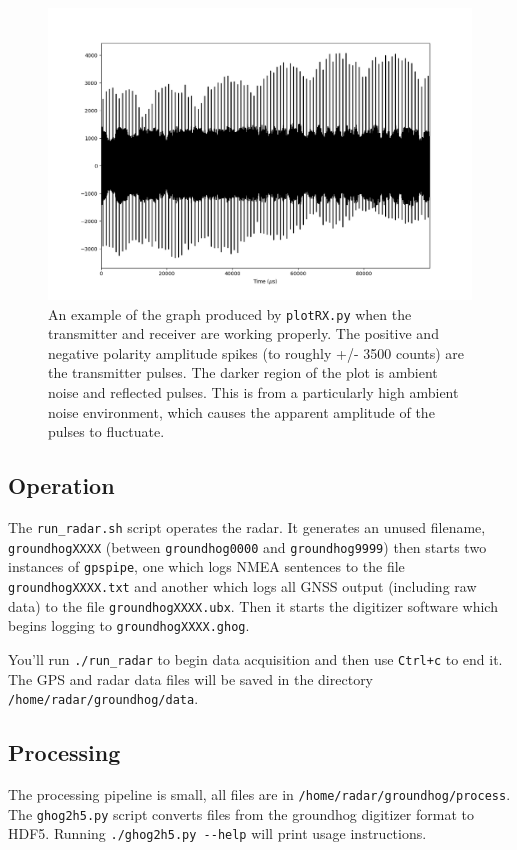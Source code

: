 \documentclass[titlepage]{article}
\begin{document}
\begin{figure}[h]
\centering
\includegraphics[width=\textwidth]{figs/plot_rx.png}
\cprotect\caption{An example of the graph produced by \verb:plotRX.py: when the transmitter and receiver are working properly. The positive and negative polarity amplitude spikes (to roughly +/- 3500 counts) are the transmitter pulses. The darker region of the plot is ambient noise and reflected pulses. This is from a particularly high ambient noise environment, which causes the apparent amplitude of the pulses to fluctuate.}
\label{fig:plot_rx}
\end{figure}

\subsection{Operation}
The \verb+run_radar.sh+ script operates the radar. It generates an unused filename, \verb|groundhogXXXX| (between \verb+groundhog0000+ and \verb+groundhog9999+) then starts two instances of \verb+gpspipe+, one which logs NMEA sentences to the file \verb|groundhogXXXX.txt| and another which logs all GNSS output (including raw data) to the file \verb|groundhogXXXX.ubx|. Then it starts the digitizer software which begins logging to \verb|groundhogXXXX.ghog|.

You'll run \verb|./run_radar| to begin data acquisition and then use \verb|Ctrl+c| to end it. The GPS and radar data files will be saved in the directory \verb|/home/radar/groundhog/data|.

\subsection{Processing}
The processing pipeline is small, all files are in \verb|/home/radar/groundhog/process|. The \verb|ghog2h5.py| script converts files from the groundhog digitizer format to HDF5. Running \verb|./ghog2h5.py --help| will print usage instructions.
\end{document}
